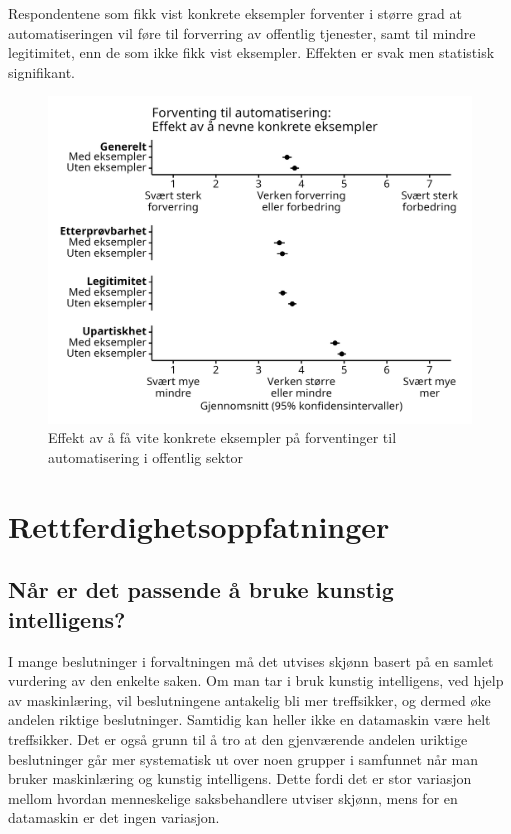 \documentclass[
  12pt,
  a4paper, 12pt]{article}
\begin{document}
Respondentene som fikk vist konkrete eksempler forventer i større grad at automatiseringen vil føre til forverring av offentlig tjenester, samt til mindre legitimitet, enn de som ikke fikk vist eksempler. Effekten er svak men statistisk signifikant.

\begin{figure}

{\centering \includegraphics[width=0.8\linewidth]{figs/png/fig_automat_treat} 

}

\caption{Effekt av å få vite konkrete eksempler på forventinger til automatisering i offentlig sektor}\label{fig:unnamed-chunk-22}
\end{figure}

\newpage

\hypertarget{rettferdighetsoppfatninger}{%
\section{Rettferdighetsoppfatninger}\label{rettferdighetsoppfatninger}}

\hypertarget{relval}{%
\subsection{Når er det passende å bruke kunstig intelligens?}\label{relval}}

I mange beslutninger i forvaltningen må det utvises skjønn basert på en samlet vurdering av den enkelte saken.
Om man tar i bruk kunstig intelligens, ved hjelp av maskinlæring, vil beslutningene antakelig bli mer treffsikker, og dermed øke andelen riktige beslutninger.
Samtidig kan heller ikke en datamaskin være helt treffsikker.
Det er også grunn til å tro at den gjenværende andelen uriktige beslutninger går mer systematisk ut over noen grupper i samfunnet når man bruker maskinlæring og kunstig intelligens.
Dette fordi det er stor variasjon mellom hvordan menneskelige saksbehandlere utviser skjønn, mens for en datamaskin er det ingen variasjon.
\end{document}

